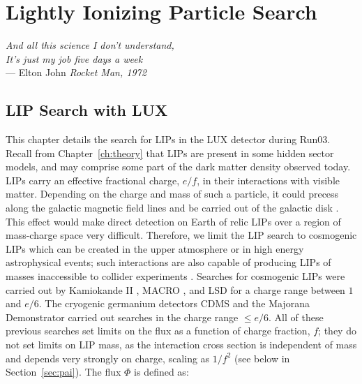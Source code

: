 \chapter{Lightly Ionizing Particle Search}

\label{ch:lips} %

\begin{flushright}{\slshape    
   And all this science I don't understand, \\
     It's just my job five days a week } \\ \medskip
    --- {Elton John \textit{Rocket Man, 1972}}
\end{flushright}

\section{LIP Search with LUX}
This chapter details the search for \ac{LIP}s in the \ac{LUX} detector during Run03. Recall from Chapter~\ref{ch:theory} that \ac{LIP}s are present in some hidden sector models, and may comprise some part of the dark matter density observed today. \ac{LIP}s carry an effective fractional charge, $e/f$, in their interactions with visible matter. Depending on the charge and mass of such a particle, it could precess along the galactic magnetic field lines and be carried out of the galactic disk \cite{McDermott2011}. This effect would make direct detection on Earth of relic \ac{LIP}s over a region of mass-charge space very difficult. Therefore, we limit the \ac{LIP} search to cosmogenic \ac{LIP}s which can be created in the upper atmosphere or in high energy astrophysical events; such interactions are also capable of producing \ac{LIP}s of masses inaccessible to collider experiments \cite{Agnese2015}. Searches for cosmogenic \ac{LIP}s were carried out by Kamiokande II \cite{Mori1991}, MACRO \cite{Ambrosio2000} \cite{Ambrosio2004}, and LSD \cite{Aglietta1994} for a charge range between $1$ and $e/6$. The cryogenic germanium detectors CDMS \cite{Agnese2015} and the Majorana Demonstrator \cite{Alvis2018} carried out searches in the charge range $\leqslant e/6$. All of these previous searches set limits on the flux as a function of charge fraction, $f$; they do not set limits on \ac{LIP} mass, as the interaction cross section is independent of mass and depends very strongly on charge, scaling as $1/f^{2}$ (see below in Section~\ref{sec:pai}). The flux $\Phi$ is defined as:

